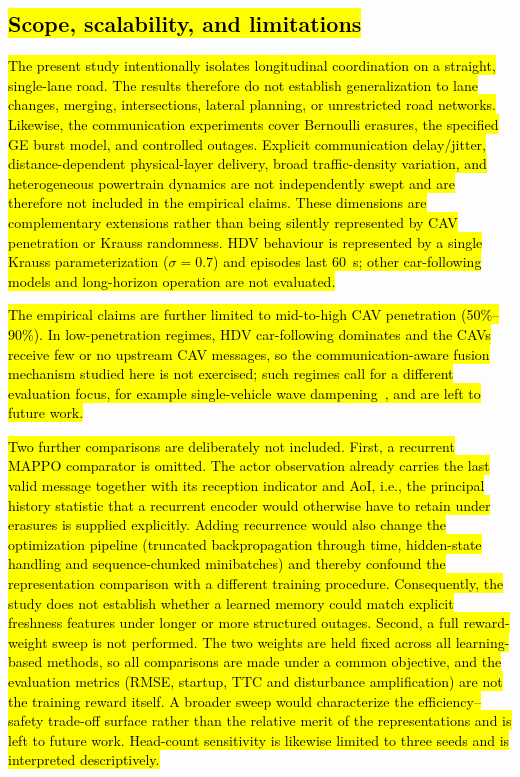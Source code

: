 \documentclass{ieeeaccess}
\begin{document}
\subsection{\hl{Scope, scalability, and limitations}}
\label{sec:limitations}

\hl{The present study intentionally isolates longitudinal coordination on a straight, single-lane road. The results therefore do not establish generalization to lane changes, merging, intersections, lateral planning, or unrestricted road networks. Likewise, the communication experiments cover Bernoulli erasures, the specified GE burst model, and controlled outages. Explicit communication delay/jitter, distance-dependent physical-layer delivery, broad traffic-density variation, and heterogeneous powertrain dynamics are not independently swept and are therefore not included in the empirical claims. These dimensions are complementary extensions rather than being silently represented by CAV penetration or Krauss randomness. HDV behaviour is represented by a single Krauss parameterization ($\sigma=0.7$) and episodes last 60~s; other car-following models and long-horizon operation are not evaluated.}

\hl{The empirical claims are further limited to mid-to-high CAV penetration (50\%--90\%). In low-penetration regimes, HDV car-following dominates and the CAVs receive few or no upstream CAV messages, so the communication-aware fusion mechanism studied here is not exercised; such regimes call for a different evaluation focus, for example single-vehicle wave dampening~\cite{wu2017flow}, and are left to future work.}

\hl{Two further comparisons are deliberately not included. First, a recurrent MAPPO comparator is omitted. The actor observation already carries the last valid message together with its reception indicator and AoI, i.e., the principal history statistic that a recurrent encoder would otherwise have to retain under erasures is supplied explicitly. Adding recurrence would also change the optimization pipeline (truncated backpropagation through time, hidden-state handling and sequence-chunked minibatches) and thereby confound the representation comparison with a different training procedure. Consequently, the study does not establish whether a learned memory could match explicit freshness features under longer or more structured outages. Second, a full reward-weight sweep is not performed. The two weights are held fixed across all learning-based methods, so all comparisons are made under a common objective, and the evaluation metrics (RMSE, startup, TTC and disturbance amplification) are not the training reward itself. A broader sweep would characterize the efficiency--safety trade-off surface rather than the relative merit of the representations and is left to future work. Head-count sensitivity is likewise limited to three seeds and is interpreted descriptively.}
\end{document}

